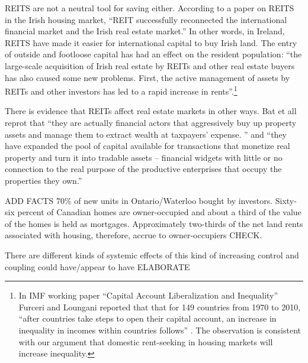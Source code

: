 REITS  are not a neutral tool for saving either. According to a paper \cite{wangAnalyzeImpactREITs2021} on REITS in the Irish housing market, ``REIT successfully reconnected the international financial market and the Irish real estate market.'' In other words, in Ireland, REITS have made it easier for international capital to buy Irish land. The entry of outside and footloose capital has had an effect on the resident population:  ``the large-scale acquisition of Irish real estate by REITs and other real estate buyers has also caused some new problems. First, the active management of assets by REITs and other investors has led to a rapid increase in rents''.\footnote{In  IMF working paper ``Capital Account Liberalization and Inequality'' \cite{furceriCapitalAccountLiberalization2015}  Furceri and Loungani reported that that for 149 countries from 1970 to 2010, ``after countries take steps to open their capital account, an increase in inequality in incomes within countries follows'' . The observation is consistent with our argument  that domestic \gls{rent-seeking} in housing markets will increase inequality.}   

There is evidence that REITs affect real estate markets in other ways. Bat et all  \cite{batRolePublicREITs2022} reprot that  ``they are actually financial actors that aggressively buy up property assets and manage them to extract wealth at taxpayers’ expense. '' and ``they have expanded the pool of capital available for transactions that monetize real property and turn it into tradable assets – financial widgets with little or no connection to the real purpose of the productive enterprises that occupy the properties they own.''

ADD FACTS 70\% of new units in Ontario/Waterloo bought by investors.
Sixty-six percent of Canadian homes are owner-occupied and about a third of the value of the homes is held as mortgages. Approximately two-thirds of the net land rents associated with housing, therefore, accrue to owner-occupiers \cite{nemtinFinancializationHousingSocial2021} CHECK. %

There are different kinds of systemic effects of this kind of increasing control and coupling could have/appear to have ELABORATE

